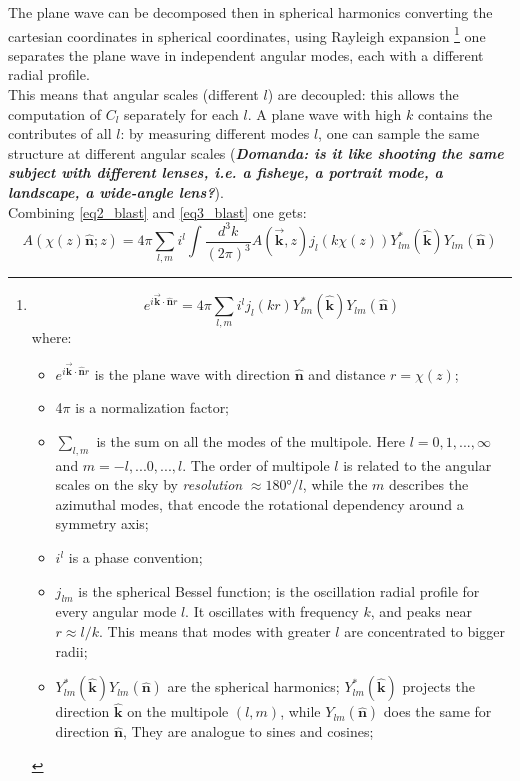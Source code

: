The plane wave can be decomposed then in spherical harmonics converting the cartesian coordinates in spherical coordinates, using Rayleigh expansion \footnote{
\begin{equation}
\label{eq3_blast}
    e^{i\vec{\textbf{k}}\cdot\hat{\textbf{n}}r} = 4\pi \sum_{l,m} i^l j_l(kr) Y^{*}_{lm}(\hat{\textbf{k}}) Y_{lm}(\hat{\textbf{n}})
\end{equation}
where:
\begin{itemize}
    \item $e^{i\vec{\textbf{k}}\cdot\hat{\textbf{n}}r}$ is the plane wave with direction $\hat{\textbf{n}}$ and distance $r = \chi(z)$;
    \item 4$\pi$ is a normalization factor;
    \item $\sum_{l,m}$ is the sum on all the modes of the multipole. Here $l = 0, 1, ..., \infty$ and $m = -l, ... 0, ..., l$. The order of multipole $l$ is related to the angular scales on the sky by  \textit{resolution} $\approx 180°/l$, while the $m$ describes the azimuthal modes, that encode the rotational dependency around a symmetry axis;
    \item $i^l$ is a phase convention;
    \item $j_{lm}$ is the spherical Bessel function; is the oscillation radial profile for every angular mode $l$. It oscillates with frequency $k$, and peaks near $r \approx l/k$. This means that modes with greater $l$ are concentrated to bigger radii;
    \item $Y^{*}_{lm}(\hat{\textbf{k}}) Y_{lm}(\hat{\textbf{n}})$ are the spherical harmonics; $Y^{*}_{lm}(\hat{\textbf{k}})$ projects the direction $\hat{\textbf{k}}$ on the multipole $(l,m)$, while $Y_{lm}(\hat{\textbf{n}})$ does the same for direction $\hat{\textbf{n}}$, They are analogue to sines and cosines;
\end{itemize}
} one separates the plane wave in independent angular modes, each with a different radial profile. \\
This means that angular scales (different $l$) are decoupled: this allows the computation of $C_l$ separately for each $l$. A plane wave with high $k$ contains the contributes of all $l$: by measuring different modes $l$, one can sample the same structure at different angular scales (\textbf{\textit{Domanda: is it like shooting the same subject with different lenses, i.e. a fisheye, a portrait mode, a landscape, a wide-angle lens?}}). \\ 
Combining \ref{eq2_blast} and \ref{eq3_blast} one gets:
\begin{equation}
    A(\chi(z) \hat{\textbf{n}}; z) = 4\pi \sum_{l,m} i^l \int \frac{d^3k}{(2\pi)^3} A(\vec{\textbf{k}}, z) j_l(k\chi(z)) Y^{*}_{lm}(\hat{\textbf{k}}) Y_{lm}(\hat{\textbf{n}}) 
\label{eq4_blast}
\end{equation}
